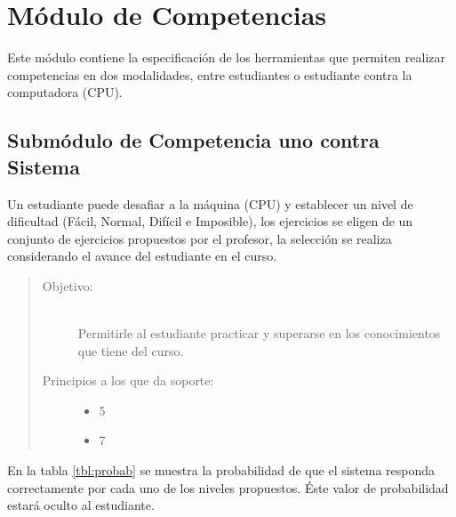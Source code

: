 \chapter{Módulo de Competencias}
\label{mod:competencias}

    Este módulo contiene la especificación de los herramientas que permiten realizar competencias en dos modalidades, entre estudiantes o estudiante contra la computadora (CPU).

\section{Submódulo de Competencia uno contra Sistema}

    Un estudiante puede desafiar a la máquina (CPU) y establecer un nivel de dificultad (Fácil, Normal, Difícil e Imposible), los ejercicios se eligen de un conjunto de ejercicios propuestos por el profesor, la selección se realiza considerando el avance del estudiante en el curso.

    \begin{quote}
    \begin{description}
        \item[Objetivo:] \hfill\\
            Permitirle al estudiante practicar y superarse en los conocimientos que tiene del curso.
        \item[Principios a los que da soporte:] \hfill
            \begin{itemize}
                \item 5 \principioV
                \item 7 \principioVII
            \end{itemize}
    \end{description}
    \end{quote}

\clearpage

    \noindent En la tabla \ref{tbl:probab} se muestra la probabilidad de que el sistema responda correctamente por cada uno de los niveles propuestos. Éste valor de probabilidad estará oculto al estudiante.\\



